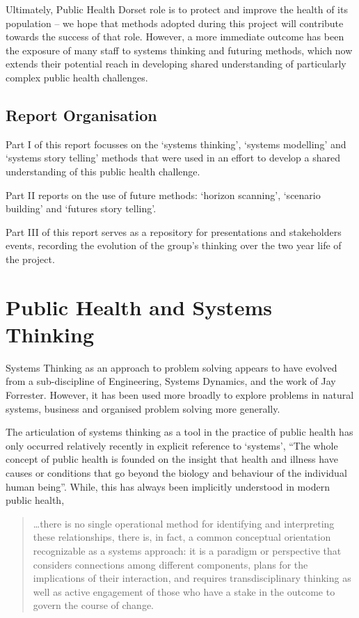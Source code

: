 Ultimately, Public Health Dorset role is to protect and improve the health of its population -- we hope that methods adopted during this project will contribute towards the success of that role. However, a more immediate outcome has been the exposure of many staff to systems thinking and futuring methods, which now extends their potential reach in developing shared understanding of particularly complex public health challenges.

\subsection{Report Organisation}

Part I of this report focusses on the `systems thinking', `systems modelling' and `systems story telling' methods that were used in an effort to develop a shared understanding of this public health challenge.

Part II reports on the use of future methods: `horizon scanning', `scenario building' and `futures story telling'.

Part III of this report serves as a repository for presentations and stakeholders events, recording the evolution of the group's thinking over the two year life of the project.

\section{Public Health and Systems Thinking}
Systems Thinking as an approach to problem solving appears to have evolved from a sub-discipline of Engineering, Systems Dynamics, and the work of Jay Forrester.\cite{WikipediaJWF} However, it has been used more broadly to explore problems in natural systems, business and organised problem solving more generally.\cite{Ford2010, Senge2006, MaaniCavana2007}

The articulation of systems thinking as a tool in the practice of public health has only occurred relatively recently in explicit reference to `systems', ``The whole concept of public health is founded on the insight that health and illness have causes or conditions that go beyond the biology and behaviour of the individual human being''.\cite{Midgley2006} While, this has always been implicitly understood in modern public health, 

\begin{quotation}
\ldots there is no single operational method for identifying and interpreting these relationships, there is, in fact, a common conceptual orientation recognizable as a systems approach: it is a paradigm or perspective that considers connections among different components, plans for the implications of their interaction, and requires transdisciplinary thinking as well as active engagement of those who have a stake in the outcome to govern the course of change.\cite{Leischow2006}
\end{quotation}

